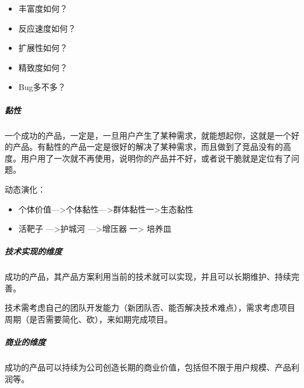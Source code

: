 \documentclass[letterpaper,10pt,english]{sphinxmanual}
\begin{document}
%
\begin{footnote}[43]\sphinxAtStartFootnote
{}
%
\end{footnote}
\begin{itemize}
\item {} 
丰富度如何？

\item {} 
反应速度如何？

\item {} 
扩展性如何？

\item {} 
精致度如何？

\item {} 
Bug多不多？

\end{itemize}


\subparagraph{黏性}
\label{\detokenize{chapter_introduction/Product:id10}}
一个成功的产品，一定是，一旦用户产生了某种需求，就能想起你，这就是一个好的产品。有黏性的产品一定是很好的解决了某种需求，而且做到了竞品没有的高度。用户用了一次就不再使用，说明你的产品并不好，或者说干脆就是定位有了问题。

动态演化：
\begin{itemize}
\item {} 
个体价值—>个体黏性—>群体黏性一>生态黏性

\item {} 
活靶子 —>护城河 —>增压器 一> 培养皿

\end{itemize}


\subparagraph{技术实现的维度}
\label{\detokenize{chapter_introduction/Product:id11}}
成功的产品，其产品方案利用当前的技术就可以实现，并且可以长期维护、持续完善。

技术需考虑自己的团队开发能力（新团队否、能否解决技术难点），需求考虑项目周期（是否需要简化、砍），来如期完成项目。%
\begin{footnote}[44]\sphinxAtStartFootnote
{}
%
\end{footnote}


\subparagraph{商业的维度}
\label{\detokenize{chapter_introduction/Product:id12}}
成功的产品可以持续为公司创造长期的商业价值，包括但不限于用户规模、产品利润等。
\end{document}
